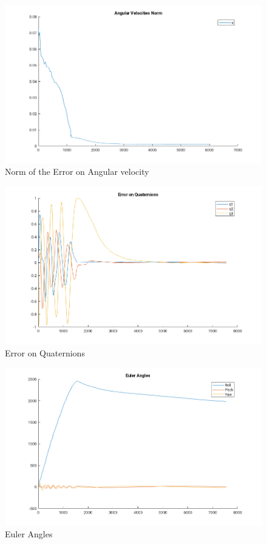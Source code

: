 \documentclass[11pt,a4paper]{report}
\begin{document}
\begin{figure}[H]
 \centering
 \includegraphics[scale=0.5]{gfx/results/w_norm.png}
 \caption{Norm of the Error on Angular velocity} 
\end{figure}

\begin{figure}[H]
 \centering
 \includegraphics[scale=0.5]{gfx/results/quaternion_error.png}
 \caption{Error on Quaternions} 
\end{figure}

\begin{figure}[H]
 \centering
 \includegraphics[scale=0.5]{gfx/results/euler_angles.png}
 \caption{Euler Angles} 
\end{figure}
\end{document}
